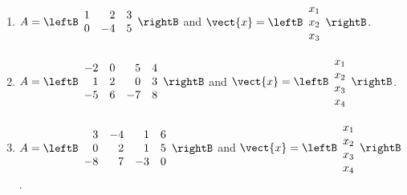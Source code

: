 \begin{multicols}{2}
\begin{ex}
\begin{enumerate}[label={\alph*.}]
\item 
$A = \leftB \begin{array}{rrr}
1 & 2 & 3 \\
0 & -4 & 5
\end{array} \rightB$ and $\vect{x} = \leftB \begin{array}{c}
x_{1} \\
x_{2} \\
x_{3}
\end{array} \rightB$.


\item
$A = \leftB \begin{array}{rrrr}
-2 & 0 & 5 & 4 \\
1 & 2 & 0 & 3 \\
-5 & 6 & -7 & 8
\end{array} \rightB$ and $\vect{x} = \leftB \begin{array}{c}
x_{1} \\
x_{2} \\
x_{3} \\
x_{4}
\end{array} \rightB$.

\item
$A = \leftB \begin{array}{rrrr}
3 & -4 & 1 & 6 \\
0 & 2 & 1 & 5 \\
-8 & 7 & -3 & 0
\end{array} \rightB$ and $\vect{x} = \leftB \begin{array}{c}
x_{1} \\
x_{2} \\
x_{3} \\
x_{4}
\end{array} \rightB$.


\end{enumerate}
\end{ex}
\end{multicols}
